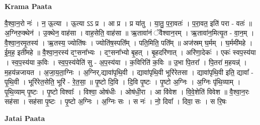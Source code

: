 \documentclass[17pt]{extarticle}
\begin{document}
\textbf{Krama Paata} \newline

वै॒श्वा॒न॒रो नः॑ । न॒ ऊ॒त्या । ऊ॒त्या ऽऽ प्र । आ प्र । प्र या॑तु । या॒तु॒ प॒रा॒वतः॑ । प॒रा॒वत॒ इति॑ परा - वतः॑ ॥ अ॒ग्निरु॒क्थेन॑ । उ॒क्थेन॒ वाह॑सा । वाह॒सेति॒ वाह॑सा ॥ ऋ॒तावा॑नं ॅवैश्वान॒रम् । ऋ॒तावा॑न॒मित्यृ॒त - वा॒न॒म् । वै॒श्वा॒न॒रमृ॒तस्य॑ । ऋ॒तस्य॒ ज्योति॑षः । ज्योति॑ष॒स्पति᳚म् । पति॒मिति॒ पति᳚म् ॥ अज॑स्रम् घ॒र्मम् । घ॒र्ममी॑महे । ई॒म॒ह॒ इती॑महे ॥ वै॒श्वा॒न॒रस्य॑ दꣳ॒॒सना᳚भ्यः । दꣳ॒॒सना᳚भ्यो बृ॒हत् । बृ॒हदरि॑णात् । अरि॑णा॒देकः॑ । एकः॑ स्वप॒स्य॑या । स्व॒प॒स्य॑या क॒विः । स्व॒प॒स्य॑येति॑ सु - अ॒प॒स्य॑या । क॒विरिति॑ क॒विः ॥ उ॒भा पि॒तरा᳚ । पि॒तरा॑ म॒हयन्न्॑ । म॒हय॑न्नजायत । अ॒जा॒य॒ता॒ग्निः । अ॒ग्निर्,द्यावा॑पृथि॒वी । द्यावा॑पृथि॒वी भूरि॑रेतसा । द्यावा॑पृथि॒वी इति॒ द्यावा᳚ - पृ॒थि॒वी । भूरि॑रेत॒सेति॒ भूरि॑ - रे॒त॒सा॒ ॥ पृ॒ष्टो दि॒वि । दि॒वि पृ॒ष्टः । पृ॒ष्टो अ॒ग्निः । अ॒ग्निः पृ॑थि॒व्याम् । पृ॒थि॒व्याम् पृ॒ष्टः । पृ॒ष्टो विश्वाः᳚ । विश्वा॒ ओष॑धीः । ओष॑धी॒रा । आ वि॑वेश । वि॒वे॒शेति॑ विवेश ॥ वै॒श्वा॒न॒रः सह॑सा । सह॑सा पृ॒ष्टः । पृ॒ष्टो अ॒ग्निः । अ॒ग्निः सः । स नः॑ । नो॒ दिवा᳚ । दिवा॒ सः । स रि॒षः \newline

\textbf{Jatai Paata} \newline
\end{document}
